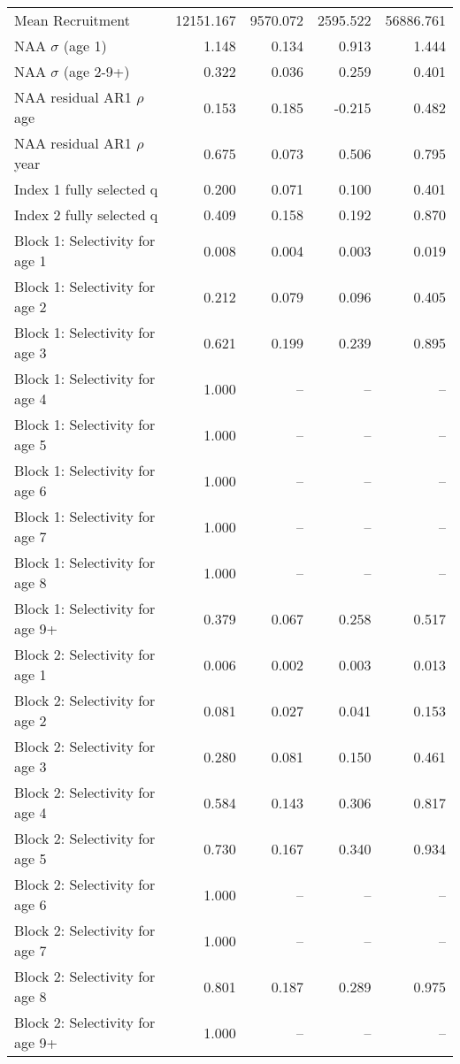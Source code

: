 \documentclass[
]{article}
\begin{document}
\begin{landscape}
\begin{longtable}[t]{lrrrr}
\endfoot
\bottomrule
\endlastfoot
Mean Recruitment & 12151.167 & 9570.072 & 2595.522 & 56886.761\\
NAA $\sigma$ (age 1) & 1.148 & 0.134 & 0.913 & 1.444\\
NAA $\sigma$ (age 2-9+) & 0.322 & 0.036 & 0.259 & 0.401\\
NAA residual AR1 $\rho$ age & 0.153 & 0.185 & -0.215 & 0.482\\
NAA residual AR1 $\rho$ year & 0.675 & 0.073 & 0.506 & 0.795\\
\addlinespace
Index 1 fully selected q & 0.200 & 0.071 & 0.100 & 0.401\\
Index 2 fully selected q & 0.409 & 0.158 & 0.192 & 0.870\\
Block 1: Selectivity for age 1 & 0.008 & 0.004 & 0.003 & 0.019\\
Block 1: Selectivity for age 2 & 0.212 & 0.079 & 0.096 & 0.405\\
Block 1: Selectivity for age 3 & 0.621 & 0.199 & 0.239 & 0.895\\
\addlinespace
Block 1: Selectivity for age 4 & 1.000 & -- & -- & --\\
Block 1: Selectivity for age 5 & 1.000 & -- & -- & --\\
Block 1: Selectivity for age 6 & 1.000 & -- & -- & --\\
Block 1: Selectivity for age 7 & 1.000 & -- & -- & --\\
Block 1: Selectivity for age 8 & 1.000 & -- & -- & --\\
\addlinespace
Block 1: Selectivity for age 9+ & 0.379 & 0.067 & 0.258 & 0.517\\
Block 2: Selectivity for age 1 & 0.006 & 0.002 & 0.003 & 0.013\\
Block 2: Selectivity for age 2 & 0.081 & 0.027 & 0.041 & 0.153\\
Block 2: Selectivity for age 3 & 0.280 & 0.081 & 0.150 & 0.461\\
Block 2: Selectivity for age 4 & 0.584 & 0.143 & 0.306 & 0.817\\
\addlinespace
Block 2: Selectivity for age 5 & 0.730 & 0.167 & 0.340 & 0.934\\
Block 2: Selectivity for age 6 & 1.000 & -- & -- & --\\
Block 2: Selectivity for age 7 & 1.000 & -- & -- & --\\
Block 2: Selectivity for age 8 & 0.801 & 0.187 & 0.289 & 0.975\\
Block 2: Selectivity for age 9+ & 1.000 & -- & -- & --\\

\end{longtable}
\end{landscape}
\end{document}

